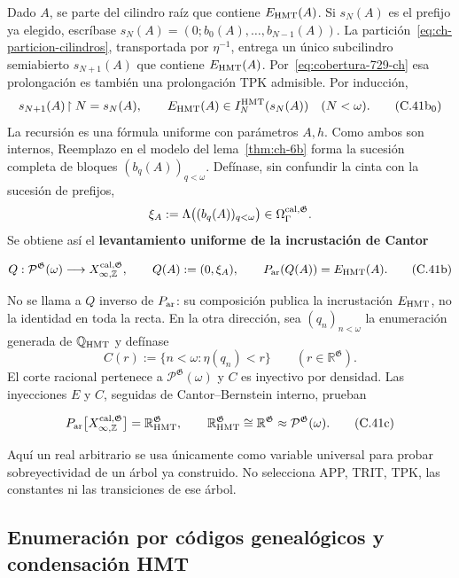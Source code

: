 Dado \(A\), se parte del cilindro raíz que contiene \(E_{\rm HMT}(A)\). Si
\(s_N(A)\) es el prefijo ya elegido, escríbase
\(s_N(A)=(0;b_0(A),\ldots,b_{N-1}(A))\). La partición~\eqref{eq:ch-particion-cilindros}, transportada
por \(\eta^{-1}\), entrega un único subcilindro semiabierto
\(s_{N+1}(A)\) que contiene \(E_{\rm HMT}(A)\). Por~\eqref{eq:cobertura-729-ch} esa prolongación es
también una prolongación TPK admisible. Por inducción,
\[
 s_{N+1}(A)\!\upharpoonright N=s_N(A),\qquad
 E_{\rm HMT}(A)\in I_N^{\rm HMT}(s_N(A))\quad(N<\omega).
\tag{C.41b$_0$}\label{eq:ch-prefijos-uniformes}
\]
La recursión es una fórmula uniforme con parámetros \(A,h\). Como ambos son
internos, Reemplazo en el modelo del lema~\ref{thm:ch-6b} forma la sucesión completa de
bloques \((b_q(A))_{q<\omega}\). Defínase, sin confundir la cinta con la
sucesión de prefijos,
\[
 \xi_A:=\Lambda\bigl((b_q(A))_{q<\omega}\bigr)
 \in\Omega_\Gamma^{\rm cal,\mathfrak G}.
\]
Se obtiene así el \textbf{levantamiento uniforme de la incrustación de Cantor}

\[
 Q:\mathcal P^{\mathfrak G}(\omega)
 \longrightarrow X_{\infty,\mathbb Z}^{\rm cal,\mathfrak G},
 \qquad
 Q(A):=(0,\xi_A),\qquad
 P_{\rm ar}(Q(A))=E_{\rm HMT}(A).
\tag{C.41b}\label{eq:ch-levantamiento-uniforme}
\]

No se llama a \(Q\) inverso de \(P_{\rm ar}\): su composición publica la
incrustación \(E_{\rm HMT}\), no la identidad en toda la recta. En la otra
dirección, sea \((q_n)_{n<\omega}\) la enumeración generada de
\(\mathbb Q_{\rm HMT}\) y defínase
\[
 C(r):=\{n<\omega:\eta(q_n)<r\}
 \qquad(r\in\mathbb R^{\mathfrak G}).
\]
El corte racional pertenece a \(\mathcal P^{\mathfrak G}(\omega)\) y
\(C\) es inyectivo por densidad. Las inyecciones \(E\) y \(C\), seguidas de
Cantor--Bernstein interno, prueban

\[
 P_{\rm ar}
 \bigl[X_{\infty,\mathbb Z}^{\rm cal,\mathfrak G}\bigr]
 =\mathbb R_{\rm HMT}^{\mathfrak G},
 \qquad
 \mathbb R_{\rm HMT}^{\mathfrak G}
 \cong\mathbb R^{\mathfrak G}
 \approx\mathcal P^{\mathfrak G}(\omega).
\tag{C.41c}\label{eq:ch-recta-potencia}
\]

Aquí un real arbitrario se usa únicamente como variable universal para probar
sobreyectividad de un árbol ya construido. No selecciona APP, TRIT, TPK, las
constantes ni las transiciones de ese árbol.

\subsection{Enumeración por códigos genealógicos y condensación HMT}

